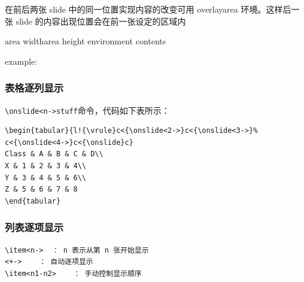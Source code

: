 在前后两张 slide 中的同一位置实现内容的改变可用 overlayarea 环境。这样后一张 slide 的内容出现位置会在前一张设定的区域内
\begin{cmd}
\begin{overlayarea}{area width}{area height}
environment contents
\end{overlayarea}
 example:
\begin{frame}
\begin{overlayarea}{\textwidth}{3cm}
\end{overlayarea}
\end{frame}
\end{cmd}

\subsubsection{表格逐列显示}


\verb|\onslide<n->stuff|命令，代码如下表所示：
\begin{shaded}
\begin{Verbatim}
\begin{tabular}{l!{\vrule}c<{\onslide<2->}c<{\onslide<3->}%
c<{\onslide<4->}c<{\onslide}c}
Class & A & B & C & D\\
X & 1 & 2 & 3 & 4\\
Y & 3 & 4 & 5 & 6\\
Z & 5 & 6 & 7 & 8
\end{tabular}
\end{Verbatim}
\end{shaded}
\subsubsection{列表逐项显示}


\begin{shaded}
\begin{Verbatim}
\item<n->  ： n 表示从第 n 张开始显示
<+->    ： 自动逐项显示
\item<n1-n2>    ： 手动控制显示顺序
\end{Verbatim}
\end{shaded}

